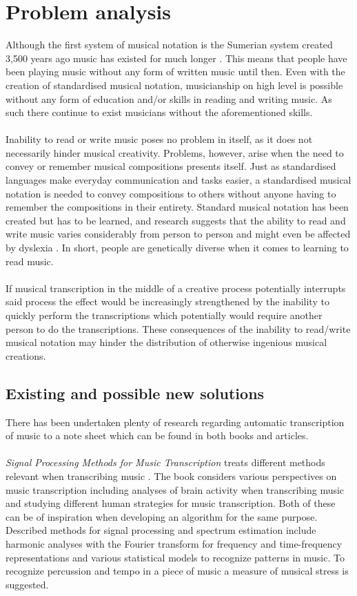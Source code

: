 \section{Problem analysis}
Although the first system of musical notation is the Sumerian system created 3,500 years ago music has existed for much longer \cite{origins}. This means that people have been playing music without any form of written music until then. Even with the creation of standardised musical notation, musicianship on high level is possible without any form of education and/or skills in reading and writing music. As such there continue to exist musicians without the aforementioned skills. \\ \\
Inability to read or write music poses no problem in itself, as it does not necessarily hinder musical creativity. Problems, however, arise when the need to convey or remember musical compositions presents itself. Just as standardised languages make everyday communication and tasks easier, a standardised musical notation is needed to convey compositions to others without anyone having to remember the compositions in their entirety. Standard musical notation has been created but has to be learned, and research suggests that the ability to read and write music varies considerably from person to person and might even be affected by dyslexia \cite{dyslexia}. In short, people are genetically diverse when it comes to learning to read music.\\\\
If musical transcription in the middle of a creative process potentially interrupts said process the effect would be increasingly strengthened by the inability to quickly perform the transcriptions which potentially would require another person to do the transcriptions. These consequences of the inability to read/write musical notation may hinder the distribution of otherwise ingenious musical creations.

\subsection{Existing and possible new solutions}
There has been undertaken plenty of research regarding automatic transcription of music to a note sheet which can be found in both books and articles. 
\\\\
\textit{Signal Processing Methods for Music Transcription} treats different methods relevant when transcribing music \cite{sol1}. 
The book considers various perspectives on music transcription including analyses of brain activity when transcribing music and studying different human strategies for music transcription. Both of these can be of inspiration when developing an algorithm for the same purpose. 
Described methods for signal processing and spectrum estimation include harmonic analyses with the Fourier transform for frequency and time-frequency representations and various statistical models to recognize patterns in music. 
To recognize percussion and tempo in a piece of music a measure of musical stress is suggested.

